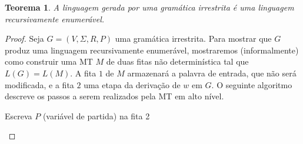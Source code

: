 \documentclass[a4paper]{article}
\newtheorem{Theorem}{Teorema}
\theoremstyle{definition}
\begin{document}
  \begin{Theorem}
    A linguagem gerada por uma gramática irrestrita é uma linguagem
    recursivamente enumerável.
  \end{Theorem}
  \begin{proof}
    Seja $G = (V,\Sigma,R,P)$ uma gramática irrestrita. Para mostrar que $G$
    produz uma linguagem recursivamente enumerável, mostraremos (informalmente)
    como construir
    uma MT $M$ de duas fitas não determinística tal que $L(G) = L(M)$.
    A fita $1$ de $M$ armazenará a palavra de entrada, que não será modificada,
    e a fita $2$ uma etapa da derivação de $w$ em $G$. O seguinte algoritmo
    descreve os passos a serem realizados pela MT em alto nível.
    
    \begin{algorithm}[H]
      Escreva $P$ (variável de partida) na fita 2 \;
    \end{algorithm}    
  \end{proof}
\end{document}
